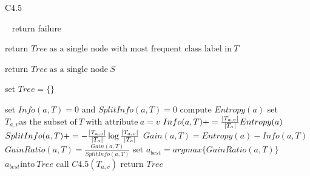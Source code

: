 \documentclass[a4paper]{article}
\begin{document}
 \begin{algorithm}
 
   \caption{C4.5  ~\cite{c4.5} }
    \begin{algorithmic}[1]
     \
      \State return failure
      \EndIf
      
      \State return $Tree \  \text{as a single node with most frequent class label in}\  T$ 
      \EndIf
     
      \State return $Tree \  \text{as a single node}\  S $ 
      \EndIf
      
   \State set $Tree = \{\}$
   
       \State set $Info(a,T) = 0$  and $SplitInfo(a,T) = 0$
       \State compute $Entropy(a)$
       \State set $T_{a,v}  \text{as the subset of} \  T \  \text{with attribute}\ a = v$  
       \State  $Info(a,T) + = \frac{\abs{T_{a,v}}}{\abs{T_{a}}} Entropy(a)$
       \State $SplitInfo(a,T)+= - \frac{\abs{T_{a,v}}}{\abs{T_{a}}} \log \frac{\abs{T_{a,v}}}{\abs{T_{a}}} $
          \EndFor
          \State $Gain(a,T) = Entropy(a) - Info(a,T)$
          \State  $GainRatio(a,T) = \frac{Gain(a,T)}{SplitInfo(a,T)}$
          \EndFor
       \State set $a_{best} = argmax \{GainRatio(a,T)\}$
       \State $a_{best} \text{into} \  Tree$
       call $C4.5(T_{a,v})$
        \EndFor
        \State return $Tree$
        
  \EndFunction
  

\end{algorithmic}
\end{algorithm}
\end{document}

